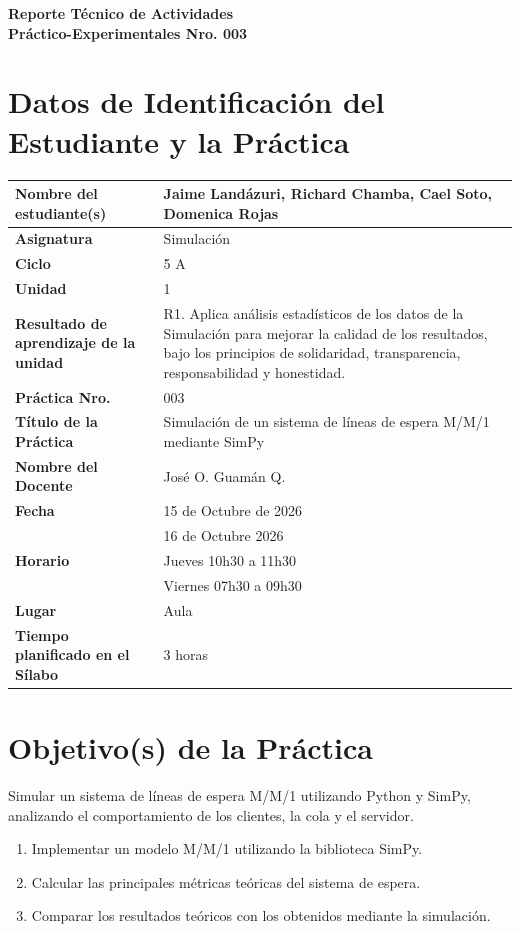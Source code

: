 \documentclass[11pt,a4paper]{article}
\begin{document}
\thispagestyle{fancy}

\vspace*{0.15cm}

\begin{center}
{\bfseries\fontsize{23}{26}\selectfont
Reporte Técnico de Actividades\\
Práctico-Experimentales Nro. 003\par}
\end{center}

\section{Datos de Identificación del Estudiante y la Práctica}

\noindent
\begin{tabularx}{\textwidth}{|L{0.43\textwidth}|Y|}
\hline
\textbf{Nombre del estudiante(s)} & Jaime Landázuri, Richard Chamba, Cael Soto, Domenica Rojas \\ \hline
\textbf{Asignatura} & Simulación \\ \hline
\textbf{Ciclo} & 5 A \\ \hline
\textbf{Unidad} & 1 \\ \hline
\textbf{Resultado de aprendizaje de la unidad} & R1. Aplica análisis estadísticos de los datos
de la Simulación para mejorar la calidad de los resultados, bajo los principios de solidaridad, transparencia, responsabilidad y honestidad. \\ \hline
\textbf{Práctica Nro.} & 003 \\ \hline
\textbf{Título de la Práctica} & Simulación de un sistema de líneas de espera M/M/1 mediante SimPy \\ \hline
\textbf{Nombre del Docente} & José O. Guamán Q. \\ \hline
\textbf{Fecha} & 15 de Octubre de 2026 \\
 & 16 de Octubre 2026 \\ \hline
\textbf{Horario} & Jueves 10h30 a 11h30 \\
 & Viernes 07h30 a 09h30 \\ \hline
\textbf{Lugar} & Aula \\ \hline
\textbf{Tiempo planificado en el Sílabo} & 3 horas \\ \hline
\end{tabularx}

\section{Objetivo(s) de la Práctica}
Simular un sistema de líneas de espera M/M/1 utilizando Python y SimPy, analizando
el comportamiento de los clientes, la cola y el servidor.
\begin{enumerate}
    \item Implementar un modelo M/M/1 utilizando la biblioteca SimPy.
    \item Calcular las principales métricas teóricas del sistema de espera.
    \item Comparar los resultados teóricos con los obtenidos mediante la simulación.
\end{enumerate}
\end{document}
